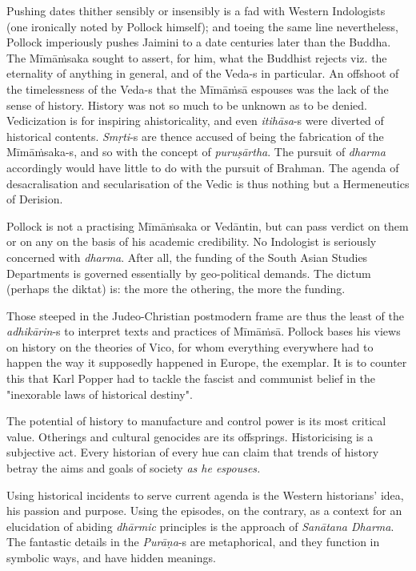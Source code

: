 Pushing dates thither sensibly or insensibly is a fad with Western Indologists (one ironically noted by Pollock himself); and toeing the same line nevertheless, Pollock imperiously pushes Jaimini to a date centuries later than the Buddha. The Mīmāṁsaka sought to assert, for him, what the Buddhist rejects viz. the eternality of anything in general, and of the Veda-s in particular. An offshoot of the timelessness of the Veda-s that the Mīmāṁsā espouses was the lack of the sense of history. History was not so much to be unknown as to be denied. Vedicization is for inspiring ahistoricality, and even \textit{itihāsa}-s were diverted of historical contents. \textit{Smṛti}-s are thence accused of being the fabrication of the Mīmāṁsaka-s, and so with the concept of \textit{puruṣārtha}. The pursuit of \textit{dharma} accordingly would have little to do with the pursuit of Brahman. The agenda of desacralisation and secularisation of the Vedic is thus nothing but a Hermeneutics of Derision.

Pollock is not a practising Mīmāṁsaka or Vedāntin, but can pass verdict on them or on any on the basis of his academic credibility. No Indologist is seriously concerned with \textit{dharma}. After all, the funding of the South Asian Studies Departments is governed essentially by geo-political demands. The dictum (perhaps the diktat) is: the more the othering, the more the funding.

 Those steeped in the Judeo-Christian postmodern frame are thus the least of the \textit{adhikārin}-s to interpret texts and practices of Mīmāṁsā. Pollock bases his views on history on the theories of Vico, for whom everything everywhere had to happen the way it supposedly happened in Europe, the exemplar. It is to counter this that Karl Popper had to tackle the fascist and communist belief in the "inexorable laws of historical destiny".

 The potential of history to manufacture and control power is its most critical value. Otherings and cultural genocides are its offsprings. Historicising is a subjective act. Every historian of every hue can claim that trends of history betray the aims and goals of society \textit{as he espouses.}

Using historical incidents to serve current agenda is the Western historians’ idea, his passion and purpose. Using the episodes, on the contrary, as a context for an elucidation of abiding \textit{dhārmic} principles is the approach of \textit{Sanātana Dharma}. The fantastic details in the \textit{Purāṇa}-s are metaphorical, and they function in symbolic ways, and have hidden meanings.

